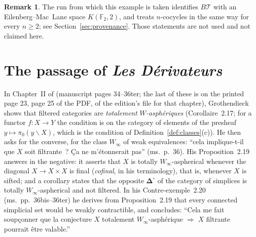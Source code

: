 \documentclass[11pt,a4paper]{article}
\theoremstyle{definition}
\newtheorem{remark}[theorem]{Remark}
\newcommand{\F}{\mathbb{F}}
\begin{document}
\begin{remark}\label{rem:tower}
The run from which this example is taken identifies $B\mathcal T$ with an
Eilenberg--Mac~Lane space $K(\F_2,2)$, and treats $n$-cocycles in the same way
for every $n\ge2$; see Section~\ref{sec:provenance}. Those statements are not
used and not claimed here.
\end{remark}
\section{The passage of \emph{Les D\'erivateurs}}\label{sec:manuscript}

In Chapter~II of \cite{Der} (manuscript pages 34--36ter; the last of these is
on the printed page 23, page 25 of the PDF, of the edition's file for that
chapter), Grothendieck shows that filtered categories are \emph{totalement
$W$-asph\'eriques} (Corollaire~2.17; for a functor $f\colon X\to Y$ the
condition is on the category of elements of the presheaf
$y\mapsto\pi_0(y\backslash X)$, which is the condition of
Definition~\ref{def:classes}(c)). He then asks for the converse, for the
class $W_\infty$ of weak equivalences: ``cela implique-t-il que $X$ soit
filtrante~? \c{C}a ne m'\'etonnerait pas'' (ms.~p.~36). His Proposition~2.19
answers in the negative: it asserts that $X$ is totally $W_\infty$-aspherical
whenever the diagonal $X\to X\times X$ is final (\emph{cofinal}, in his
terminology), that is, whenever $X$ is sifted; and a corollary states that
the opposite $\boldsymbol\Delta^{\circ}$ of the category of simplices is
totally $W_\infty$-aspherical and not filtered. In his Contre-exemple~2.20
(ms.~pp.~36bis--36ter) he derives from Proposition~2.19 that every connected
simplicial set would be weakly contractible, and concludes: ``Cela me fait
soup\c{c}onner que la conjecture
$X$ totalement $W_\infty$-asph\'erique $\Longrightarrow$ $X$ filtrante
pourrait \^etre valable.''
\end{document}
